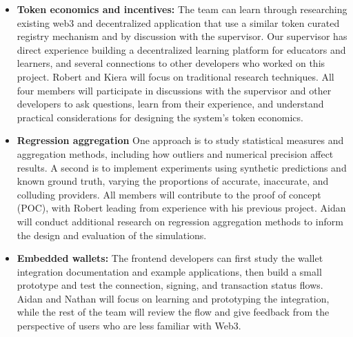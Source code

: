 \documentclass[12pt]{article}
\begin{document}
\begin{enumerate}
\begin{itemize}
    \item \textbf{Token economics and incentives:} The team can learn through
    researching existing web3 and decentralized application that use a similar
    token curated registry mechanism and by discussion with the supervisor. Our
    supervisor has direct experience building a decentralized learning
    platform for educators and learners, and several connections to other
    developers who worked on this project. Robert and Kiera will focus on
    traditional research techniques. All four members will participate in
    discussions with the supervisor and other developers to ask questions,
    learn from their experience, and understand practical considerations for
    designing the system's token economics.

    \item \textbf{Regression aggregation}
    One approach is to study statistical measures and aggregation methods,
    including how outliers and numerical precision affect results. A second is
    to implement experiments using synthetic predictions and known ground
    truth, varying the proportions of accurate, inaccurate, and colluding
    providers. All members will contribute to the proof of
    concept (POC), with Robert leading from experience with his previous project.
    Aidan will conduct additional research on regression
    aggregation methods to inform the design and evaluation of the simulations.

    \item \textbf{Embedded wallets:} The frontend developers can first
    study the wallet integration documentation and example applications, then
    build a small prototype and test the connection, signing, and transaction
    status flows. Aidan and Nathan will focus on learning and prototyping the
    integration, while the rest of the team will review the flow and give
    feedback from the perspective of users who are less familiar with Web3.
  \end{itemize}

\end{enumerate}


\newpage
\end{document}
